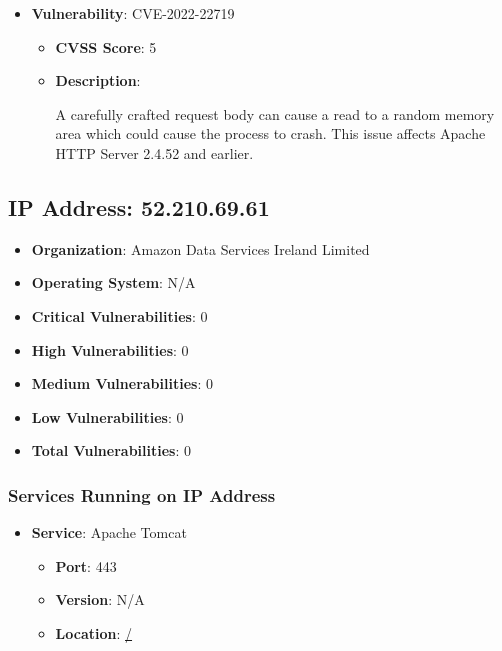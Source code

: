 \documentclass{article}
\begin{document}
\begin{itemize}
        \item \textbf{Vulnerability}: CVE-2022-22719
        \begin{itemize}
            \item \textbf{CVSS Score}:  5 
            \item \textbf{Description}:
            \parbox[t]{0.9\linewidth}{
                \ttfamily A carefully crafted request body can cause a read to a random memory area which could cause the process to crash. This issue affects Apache HTTP Server 2.4.52 and earlier.
            }
        \end{itemize}
    
\end{itemize}




\clearpage



\subsection{IP Address: 52.210.69.61}

\begin{itemize}
    \item \textbf{Organization}: Amazon Data Services Ireland Limited
    \item \textbf{Operating System}:  N/A 
    \item \textbf{Critical Vulnerabilities}: 0
    \item \textbf{High Vulnerabilities}: 0
    \item \textbf{Medium Vulnerabilities}: 0
    \item \textbf{Low Vulnerabilities}: 0
    \item \textbf{Total Vulnerabilities}: 0
\end{itemize}

\subsubsection*{Services Running on IP Address}

\begin{itemize}
    
        \item \textbf{Service}: Apache Tomcat
        \begin{itemize}
            \item \textbf{Port}: 443
            \item \textbf{Version}:  N/A 
            \item \textbf{Location}: \href{ / }{ / }
        \end{itemize}
    
\end{itemize}
\end{document}
